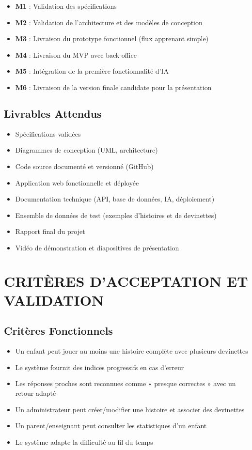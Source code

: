 \documentclass[12pt,a4paper]{article}
\begin{document}
\begin{itemize}
    \item \textbf{M1} : Validation des spécifications
    \item \textbf{M2} : Validation de l'architecture et des modèles de conception
    \item \textbf{M3} : Livraison du prototype fonctionnel (flux apprenant simple)
    \item \textbf{M4} : Livraison du MVP avec back-office
    \item \textbf{M5} : Intégration de la première fonctionnalité d'IA
    \item \textbf{M6} : Livraison de la version finale candidate pour la présentation
\end{itemize}

\subsection{Livrables Attendus}

\begin{itemize}
    \item Spécifications validées
    \item Diagrammes de conception (UML, architecture)
    \item Code source documenté et versionné (GitHub)
    \item Application web fonctionnelle et déployée
    \item Documentation technique (API, base de données, IA, déploiement)
    \item Ensemble de données de test (exemples d'histoires et de devinettes)
    \item Rapport final du projet
    \item Vidéo de démonstration et diapositives de présentation
\end{itemize}


\newpage

\section{CRITÈRES D'ACCEPTATION ET VALIDATION}

\subsection{Critères Fonctionnels}

\begin{itemize}
    \item Un enfant peut jouer au moins une histoire complète avec plusieurs devinettes
    \item Le système fournit des indices progressifs en cas d'erreur
    \item Les réponses proches sont reconnues comme « presque correctes » avec un retour adapté
    \item Un administrateur peut créer/modifier une histoire et associer des devinettes
    \item Un parent/enseignant peut consulter les statistiques d'un enfant
    \item Le système adapte la difficulté au fil du temps
\end{itemize}
\end{document}
